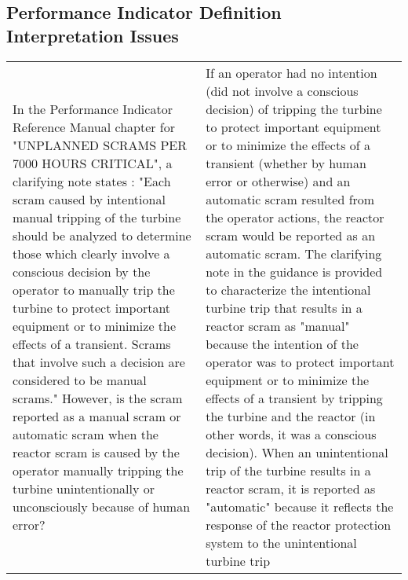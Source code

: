 \subsection{Performance Indicator Definition Interpretation Issues}
\begin{longtable}{p{7cm}p{7cm}}
    In the Performance Indicator Reference Manual chapter for
  "UNPLANNED SCRAMS PER 7000 HOURS CRITICAL", a clarifying note states
  : "Each scram caused by intentional manual tripping of the turbine
  should be analyzed to determine those which clearly involve a
  conscious decision by the operator to manually trip the turbine to
  protect important equipment or to minimize the effects of a
  transient. Scrams that involve such a decision are considered to be
  manual scrams." However, is the scram reported as a manual scram or
  automatic scram when the reactor scram is caused by the operator
  manually tripping the turbine unintentionally or unconsciously
  because of human error? &
    If an operator had no intention (did not involve a conscious
                            decision) of tripping the turbine to
                            protect important equipment or to minimize
                            the effects of a transient (whether by
                            human error or otherwise) and an automatic
                            scram resulted from the operator actions,
                            the reactor scram would be reported as an
                            automatic scram. The clarifying note in
                            the guidance is provided to characterize
                            the intentional turbine trip that results
                            in a reactor scram as "manual" because the
                            intention of the operator was to protect
                            important equipment or to minimize the
                            effects of a transient by tripping the
                            turbine and the reactor (in other words,
                            it was a conscious decision). When an
                            unintentional trip of the turbine results
                            in a reactor scram, it is reported as
                            "automatic" because it reflects the
                            response of the reactor protection system
                            to the unintentional turbine trip\\



\end{longtable}
